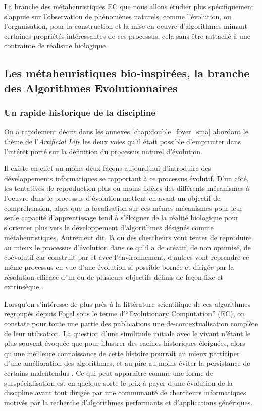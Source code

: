 La branche des métaheuristiques EC que nous allons étudier plus spécifiquement s'appuie sur l'observation de phénomènes naturels, comme l'évolution, ou l'organisation, pour la construction et la mise en oeuvre d'algorithmes mimant certaines propriétés intéressantes de ces processus, cela sans être rattaché à une contrainte de réalisme biologique.

\subsection{Les métaheuristiques bio-inspirées, la branche des Algorithmes Evolutionnaires}
\label{ssec:EA}

\subsubsection{Un rapide historique de la discipline}
\label{sssec:historique_EA}

On a rapidement décrit dans les annexes \ref{chap:double_foyer_sma} abordant le thème de l'\textit{Artificial Life} les deux voies qu'il était possible d'emprunter dans l'intérêt porté sur la définition du processus naturel d'évolution.

Il existe en effet au moins deux façons aujourd'hui d'introduire des développements informatiques se rapportant à ce processus évolutif. D'un côté, les tentatives de reproduction plus ou moins fidèles des différents mécanismes à l'oeuvre dans le processus d'évolution mettent en avant un objectif de compréhension, alors que la focalisation sur ces mêmes mécanismes pour leur seule capacité d'apprentissage tend à s'éloigner de la réalité biologique pour s'orienter plus vers le développement d'algorithmes désignés comme métaheuristiques. Autrement dit, là ou des chercheurs vont tenter de reproduire au mieux le processus d'évolution dans ce qu'il a de créatif, de non optimisé, de coévolutif car construit par  et avec l'environnement, d'autres vont reprendre ce même processus en vue d'une évolution si possible bornée et dirigée par la résolution efficace d'un ou de plusieurs objectifs définis de façon fixe et extrinsèque \autocites{Taylor2001, Taylor2012}.

Lorsqu'on s'intéresse de plus près à la littérature scientifique de ces algorithmes regroupés depuis Fogel sous le terme d'\foreignquote{english}{Evolutionary Computation} (EC), on constate pour toute une partie des publications une de-contextualisation complète de leur utilisation. La question d'une similitude initiale avec le vivant n'étant le plus souvent évoquée que pour illustrer des racines historiques éloignées, alors qu'une meilleure connaissance de cette histoire pourrait au mieux participer d'une amélioration des algorithmes, et au pire au moins éviter la persistance de certains malentendus \autocite{DeJong1993a}. Ce qui peut apparaître comme une forme de surspécialisation est en quelque sorte le prix à payer d'une évolution de la discipline avant tout dirigée par une communauté de chercheurs informatiques motivés par la recherche d'algorithmes performants et d'applications génériques.

